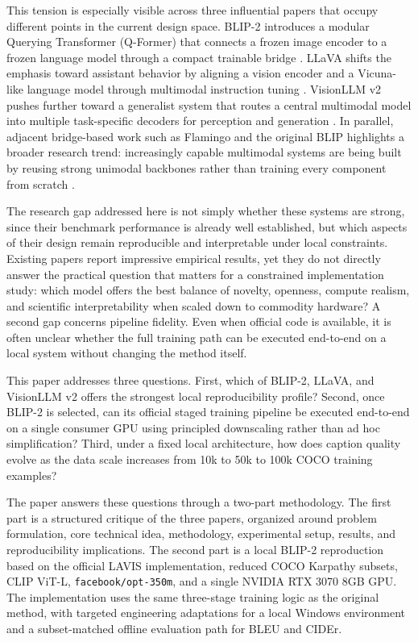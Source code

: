 \documentclass[11pt]{article}
\begin{document}
This tension is especially visible across three influential papers that occupy
different points in the current design space. BLIP-2 introduces a modular
Querying Transformer (Q-Former) that connects a frozen image encoder to a frozen
language model through a compact trainable bridge \citep{li2023blip2}. LLaVA shifts
the emphasis toward assistant behavior by aligning a vision encoder and a Vicuna-like
language model through multimodal instruction tuning \citep{liu2023visual}. VisionLLM
v2 pushes further toward a generalist system that routes a central multimodal model
into multiple task-specific decoders for perception and generation
\citep{wu2024visionllmv2}. In parallel, adjacent bridge-based work such as Flamingo
and the original BLIP highlights a broader research trend: increasingly capable
multimodal systems are being built by reusing strong unimodal backbones rather than
training every component from scratch \citep{alayrac2022flamingo,li2022blip}.

The research gap addressed here is not simply whether these systems are strong, since
their benchmark performance is already well established, but which aspects of their
design remain reproducible and interpretable under local constraints. Existing
papers report impressive empirical results, yet they do not directly answer the
practical question that matters for a constrained implementation study: which model
offers the best balance of novelty, openness, compute realism, and scientific
interpretability when scaled down to commodity hardware? A second gap concerns
pipeline fidelity. Even when official code is available, it is often unclear whether
the full training path can be executed end-to-end on a local system without changing
the method itself.

This paper addresses three questions. First, which of BLIP-2, LLaVA, and VisionLLM
v2 offers the strongest local reproducibility profile? Second, once BLIP-2 is
selected, can its official staged training pipeline be executed end-to-end on a
single consumer GPU using principled downscaling rather than ad hoc simplification?
Third, under a fixed local architecture, how does caption quality evolve as the data
scale increases from 10k to 50k to 100k COCO training examples?

The paper answers these questions through a two-part methodology. The first part is a
structured critique of the three papers, organized around problem formulation, core
technical idea, methodology, experimental setup, results, and reproducibility
implications. The second part is a local BLIP-2 reproduction based on the
official LAVIS implementation, reduced COCO Karpathy subsets, CLIP ViT-L,
\texttt{facebook/opt-350m}, and a single NVIDIA RTX 3070 8GB GPU. The implementation
uses the same three-stage training logic as the original method, with targeted
engineering adaptations for a local Windows environment and a subset-matched offline
evaluation path for BLEU and CIDEr.
\end{document}
